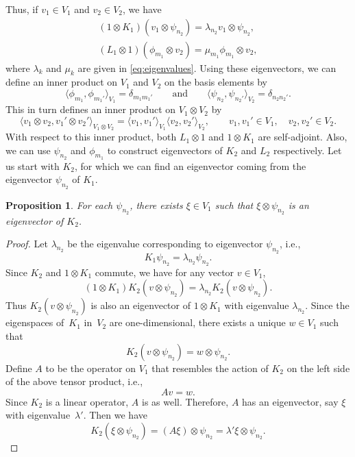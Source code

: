 \documentclass[10pt,a4paper]{amsart}
\numberwithin{equation}{section}
\newtheorem{Proposition}[Theorem]{Proposition}
 { \theoremstyle{definition}
\newtheorem{Definition}[Theorem]{Definition}
\newtheorem{Note}[Theorem]{Note}
\newtheorem{Example}[Theorem]{Example}
\newtheorem{Remark}[Theorem]{Remark} }
\begin{document}
Thus, if $v_1\in V_1$ and $v_2\in V_2$, we have
\begin{gather*}
(1\otimes K_1)(v_1\otimes \psi_{n_2})=\lambda_{n_2}v_1\otimes \psi_{n_2},\\
(L_1\otimes 1)(\phi_{m_1}\otimes v_2)=\mu_{m_1} \phi_{m_1}\otimes v_2,
\end{gather*}
where $\lambda_k$ and $\mu_k$ are given in \eqref{eq:eigenvalues}.
Using these eigenvectors, we can define an inner product on $V_1$ and $V_2$ on the basis elements by
\[
\big\langle \phi_{m_1},\phi_{m_1'}\big\rangle_{V_1}=\delta_{m_1m_1'}\qquad \text{and}\qquad \big\langle \psi_{n_2},\psi_{n_2'}\big\rangle_{V_2}=\delta_{n_2n_2'}.
\]
This in turn defines an inner product on $V_1\otimes V_2$ by
\[
\langle v_1\otimes v_2,v_1'\otimes v_2'\rangle_{V_1\otimes V_2}= \langle v_1,v_1'\rangle_{V_1}\langle v_2,v_2'\rangle_{V_2},\qquad v_1,v_1'\in V_1, \quad v_2,v_2'\in V_2.
\]
With respect to this inner product, both $L_1\otimes 1$ and $1\otimes K_1$ are self-adjoint. Also, we can use $\psi_{n_2}$ and $\phi_{m_1}$ to construct eigenvectors of $K_2$ and $L_2$ respectively. Let us start with $K_2$, for which we can find an eigenvector coming from the eigenvector $\psi_{n_2}$ of $K_1$.
\begin{Proposition}
	For each $\psi_{n_2}$, there exists $\xi\in V_1$ such that $\xi\otimes \psi_{n_2}$ is an eigenvector of $K_2$.
\end{Proposition}
\begin{proof}
	Let $\lambda_{n_2}$ be the eigenvalue corresponding to eigenvector $\psi_{n_2}$, i.e.,
	\[
	K_1\psi_{n_2}=\lambda_{n_2}\psi_{n_2}.
	\]
	Since $K_2$ and $1\otimes K_1$ commute, we have for any vector $v\in V_1$,
	\[
	(1\otimes K_1)K_2 (v\otimes \psi_{n_2}) = \lambda_{n_2} K_2 (v\otimes \psi_{n_2}).
	\]
	Thus $K_2 (v\otimes \psi_{n_2})$ is also an eigenvector of $1\otimes K_1$ with eigenvalue $\lambda_{n_2}$. Since the eigenspaces of~$K_1$ in~$V_2$ are one-dimensional, there exists a unique $w\in V_1$ such that
	\[
	K_2 (v\otimes \psi_{n_2}) = w\otimes \psi_{n_2}.
	\]
	Define $A$ to be the operator on $V_1$ that resembles the action of $K_2$ on the left side of the above tensor product, i.e.,
	\[
	A v =w.
	\]
	Since $K_2$ is a linear operator, $A$ is as well. Therefore, $A$ has an eigenvector, say $\xi$ with eigenvalue~$\lambda'$. Then we have
	\[
	K_2 (\xi\otimes \psi_{n_2}) = (A\xi)\otimes \psi_{n_2} =\lambda'\xi\otimes \psi_{n_2}. \tag*{\qed}
	\]\renewcommand{\qed}{}
\end{proof}
\end{document}
